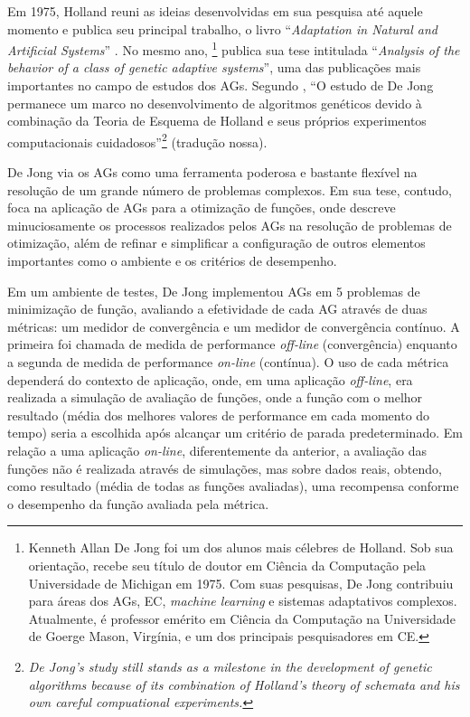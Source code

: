 Em 1975, Holland reuni as ideias desenvolvidas em sua pesquisa até aquele momento e publica seu principal trabalho, o livro \enquote{\textit{Adaptation in Natural and Artificial Systems}} . No mesmo ano, \footnote{Kenneth Allan De Jong foi um dos alunos mais célebres de Holland. Sob sua orientação, recebe seu título de doutor em Ciência da Computação pela Universidade de Michigan em 1975. Com suas pesquisas, De Jong contribuiu para áreas dos AGs, EC, \textit{machine learning} e sistemas adaptativos complexos. Atualmente, é professor emérito em Ciência da Computação na Universidade de Goerge Mason, Virgínia, e um dos principais pesquisadores em CE.} publica sua tese intitulada \enquote{\textit{Analysis of the behavior of a class of genetic adaptive systems}}, uma das publicações mais importantes no campo de estudos dos AGs. Segundo , \enquote{O estudo de De Jong permanece um marco no desenvolvimento de algoritmos genéticos devido à combinação da Teoria de Esquema de Holland e seus próprios experimentos computacionais cuidadosos}\footnote{\textit{De Jong's study still stands as a milestone in the development of genetic algorithms because of its combination of Holland's theory of schemata and his own careful compuational experiments.}} (tradução nossa).

De Jong via os AGs como uma ferramenta poderosa e bastante flexível na resolução de um grande número de problemas complexos. Em sua tese, contudo, foca na aplicação de AGs para a otimização de funções, onde descreve minuciosamente os processos realizados pelos AGs na resolução de problemas de otimização, além de refinar e simplificar a configuração de outros elementos importantes como o ambiente e os critérios de desempenho. 

Em um ambiente de testes, De Jong implementou AGs em 5 problemas de minimização de função, avaliando a efetividade de cada AG através de duas métricas: um medidor de convergência e um medidor de convergência contínuo. A primeira foi chamada de medida de performance \textit{off-line} (convergência) enquanto a segunda de medida de performance \textit{on-line} (contínua). O uso de cada métrica dependerá do contexto de aplicação, onde, em uma aplicação \textit{off-line}, era realizada a simulação de avaliação de funções, onde a função com o melhor resultado (média dos melhores valores de performance em cada momento do tempo) seria a escolhida após alcançar um critério de parada predeterminado. Em relação a uma aplicação \textit{on-line}, diferentemente da anterior, a avaliação das funções não é realizada através de simulações, mas sobre dados reais, obtendo, como resultado (média de todas as funções avaliadas), uma recompensa conforme o desempenho da função avaliada pela métrica.

